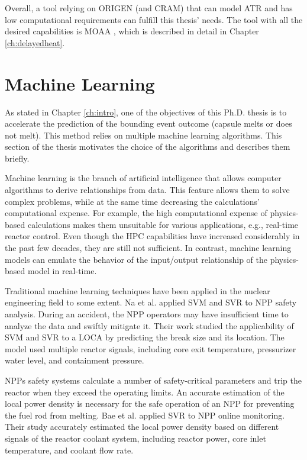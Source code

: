 Overall, a tool relying on ORIGEN (and CRAM) that can model ATR and has low computational requirements can fulfill this thesis' needs.
The tool with all the desired capabilities is MOAA \cite{fairhurst_development_2022}, which is described in detail in Chapter \ref{ch:delayedheat}.


\section{Machine Learning}

As stated in Chapter \ref{ch:intro}, one of the objectives of this Ph.D. thesis is to accelerate the prediction of the bounding event outcome (capsule melts or does not melt).
This method relies on multiple machine learning algorithms.
This section of the thesis motivates the choice of the algorithms and describes them briefly.

Machine learning is the branch of artificial intelligence that allows computer algorithms to derive relationships from data.
This feature allows them to solve complex problems, while at the same time decreasing the calculations' computational expense.
For example, the high computational expense of physics-based calculations makes them unsuitable for various applications, e.g., real-time reactor control.
Even though the \gls*{HPC} capabilities have increased considerably in the past few decades, they are still not sufficient.
In contrast, machine learning models can emulate the behavior of the input/output relationship of the physics-based model in real-time.

Traditional machine learning techniques have been applied in the nuclear engineering field to some extent.
Na et al. \cite{na_detection_2008} applied \gls*{SVM} and \gls*{SVR} to \gls*{NPP} safety analysis.
During an accident, the NPP operators may have insufficient time to analyze the data and swiftly mitigate it.
Their work studied the applicability of \gls*{SVM} and \gls*{SVR} to a \gls*{LOCA} by predicting the break size and its location.
The model used multiple reactor signals, including core exit temperature, pressurizer water level, and containment pressure.

NPPs safety systems calculate a number of safety-critical parameters and trip the reactor when they exceed the operating limits.
An accurate estimation of the local power density is necessary for the safe operation of an NPP for preventing the fuel rod from melting.
Bae et al. \cite{bae_estimation_2009} applied \gls*{SVR} to \gls*{NPP} online monitoring.
Their study accurately estimated the local power density based on different signals of the reactor coolant system, including reactor power, core inlet temperature, and coolant flow rate.

